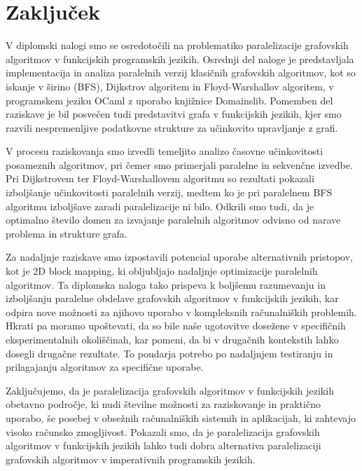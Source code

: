 \documentclass[mat1, tisk]{fmfdelo}
\begin{document}
\section{Zaključek}

V diplomski nalogi smo se osredotočili na problematiko paralelizacije grafovskih algoritmov v funkcijskih programskih jezikih.
Osrednji del naloge je predstavljala implementacija in analiza paralelnih verzij klasičnih grafovskih algoritmov, kot so iskanje v širino (BFS),
Dijkstrov algoritem in Floyd-Warshallov algoritem, v programskem jeziku OCaml z uporabo knjižnice Domainslib. Pomemben del raziskave je
bil posvečen tudi predstavitvi grafa v funkcijskih jezikih, kjer smo razvili nespremenljive podatkovne strukture za učinkovito upravljanje z grafi.

V procesu raziskovanja smo izvedli temeljito analizo časovne učinkovitosti posameznih algoritmov, pri čemer smo primerjali paralelne in sekvenčne izvedbe.
Pri Dijkstrovem ter Floyd-Warshallovem algoritmu so rezultati pokazali izboljšanje učinkovitosti paralelnih verzij, medtem ko je pri paralelnem BFS algoritmu
izboljšave zaradi paralelizacije ni bilo. Odkrili smo tudi, da je optimalno število domen za izvajanje paralelnih algoritmov odvisno od narave problema
in strukture grafa.

Za nadaljnje raziskave smo izpostavili potencial uporabe alternativnih pristopov, kot je 2D block mapping, ki obljubljajo nadaljnje
optimizacije paralelnih algoritmov. Ta diplomska naloga tako prispeva k boljšemu razumevanju in izboljšanju paralelne obdelave grafovskih
algoritmov v funkcijskih jezikih, kar odpira nove možnosti za njihovo uporabo v kompleksnih računalniških problemih.
Hkrati pa moramo upoštevati, da so bile naše ugotovitve dosežene v specifičnih eksperimentalnih okoliščinah, kar pomeni, da bi v drugačnih
kontekstih lahko dosegli drugačne rezultate. To poudarja potrebo po nadaljnjem testiranju in prilagajanju algoritmov za specifične uporabe.

Zaključujemo, da je paralelizacija grafovskih algoritmov v funkcijskih jezikih obetavno področje, ki nudi številne možnosti za raziskovanje in
praktično uporabo, še posebej v obsežnih računalniških sistemih in aplikacijah, ki zahtevajo visoko računsko zmogljivost.
Pokazali smo, da je paralelizacija grafovskih algoritmov v funkcijskih jezikih lahko tudi dobra alternativa paralelizaciji grafovskih algoritmov
v imperativnih programskih jezikih.
\end{document}
